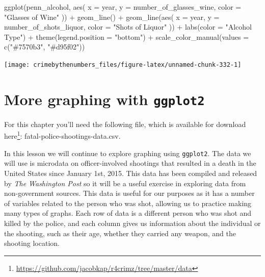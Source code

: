 \documentclass[
  a4paper,
]{krantz}
\makeatletter
\newenvironment{Shaded}{\begin{snugshade}}{\end{snugshade}}
\newcommand{\AttributeTok}[1]{\textcolor[rgb]{0.61,0.61,0.61}{#1}}
\newcommand{\FunctionTok}[1]{\textcolor[rgb]{0,0,0}{#1}}
\newcommand{\NormalTok}[1]{#1}
\newcommand{\SpecialCharTok}[1]{\textcolor[rgb]{0,0,0}{#1}}
\newcommand{\StringTok}[1]{\textcolor[rgb]{0.5,0.5,0.5}{#1}}
\renewcommand{\href}[2]{#2\footnote{\url{#1}}}
\newenvironment{kframe}{%
\medskip{}
\setlength{\fboxsep}{.8em}
 \def\at@end@of@kframe{}%
 \ifinner\ifhmode%
  \def\at@end@of@kframe{\end{minipage}}%
  \begin{minipage}{\columnwidth}%
 \fi\fi%
 \def\FrameCommand##1{\hskip\@totalleftmargin \hskip-\fboxsep
 \colorbox{shadecolor}{##1}\hskip-\fboxsep
     \hskip-\linewidth \hskip-\@totalleftmargin \hskip\columnwidth}%
 \MakeFramed {\advance\hsize-\width
   \@totalleftmargin\z@ \linewidth\hsize
   \@setminipage}}%
 {\par\unskip\endMakeFramed%
 \at@end@of@kframe}
\renewenvironment{Shaded}{\begin{kframe}}{\end{kframe}}
\makeatother
\begin{document}
\begin{Shaded}
\begin{Highlighting}[]
\FunctionTok{ggplot}\NormalTok{(penn\_alcohol, }\FunctionTok{aes}\NormalTok{(}
  \AttributeTok{x =}\NormalTok{ year,}
  \AttributeTok{y =}\NormalTok{ number\_of\_glasses\_wine,}
  \AttributeTok{color =} \StringTok{"Glasses of Wine"}
\NormalTok{)) }\SpecialCharTok{+}
  \FunctionTok{geom\_line}\NormalTok{() }\SpecialCharTok{+}
  \FunctionTok{geom\_line}\NormalTok{(}\FunctionTok{aes}\NormalTok{(}
    \AttributeTok{x =}\NormalTok{ year,}
    \AttributeTok{y =}\NormalTok{ number\_of\_shots\_liquor,}
    \AttributeTok{color =} \StringTok{"Shots of Liquor"}
\NormalTok{  )) }\SpecialCharTok{+}
  \FunctionTok{labs}\NormalTok{(}\AttributeTok{color =} \StringTok{"Alcohol Type"}\NormalTok{) }\SpecialCharTok{+}
  \FunctionTok{theme}\NormalTok{(}\AttributeTok{legend.position =} \StringTok{"bottom"}\NormalTok{) }\SpecialCharTok{+}
  \FunctionTok{scale\_color\_manual}\NormalTok{(}\AttributeTok{values =} \FunctionTok{c}\NormalTok{(}\StringTok{"\#7570b3"}\NormalTok{, }\StringTok{"\#d95f02"}\NormalTok{))}
\end{Highlighting}
\end{Shaded}

\begin{center}\texttt{[image: crimebythenumbers\_files/figure-latex/unnamed-chunk-332-1]} \end{center}

\hypertarget{ois-graphs}{%
\chapter{\texorpdfstring{More graphing with
\texttt{ggplot2}}{More graphing with ggplot2}}\label{ois-graphs}}

For this chapter you'll need the following file, which is
available for download
\href{https://github.com/jacobkap/r4crimz/tree/master/data}{here}:
fatal-police-shootings-data.csv.

In this lesson we will continue to explore graphing using
\texttt{ggplot2}. The data we will use is microdata on
officer-involved shootings that resulted in a death in the
United States since January 1st, 2015. This data has been
compiled and released by \emph{The Washington Post} so it
will be a useful exercise in exploring data from
non-government sources. This data is useful for our purposes
as it has a number of variables related to the person who
was shot, allowing us to practice making many types of
graphs. Each row of data is a different person who was shot
and killed by the police, and each column gives us
information about the individual or the shooting, such as
their age, whether they carried any weapon, and the shooting
location.
\end{document}
